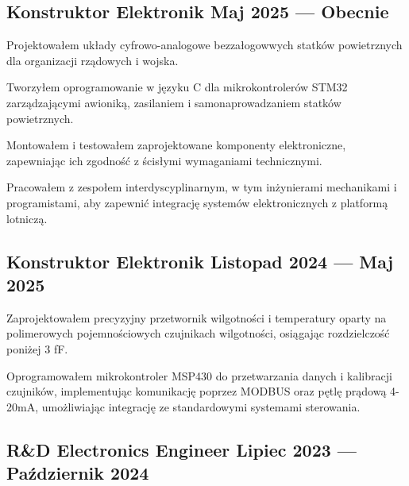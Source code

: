 
\subsection{{Konstruktor Elektronik \hfill Maj 2025 --- Obecnie}}

\begin{zitemize}
    \item Projektowałem układy cyfrowo-analogowe bezzałogowwych statków powietrznych dla organizacji rządowych i wojska.
    \item Tworzyłem oprogramowanie w języku C dla mikrokontrolerów STM32 zarządzającymi awioniką, zasilaniem i samonaprowadzaniem statków powietrznych.
    \item Montowałem i testowałem zaprojektowane komponenty elektroniczne, zapewniając ich zgodność z ścisłymi wymaganiami technicznymi.
    \item Pracowałem z zespołem interdyscyplinarnym, w tym inżynierami mechanikami i programistami, aby zapewnić integrację systemów elektronicznych z platformą lotniczą.
\end{zitemize}

\subsection{{Konstruktor Elektronik \hfill Listopad 2024 --- Maj 2025}}

\begin{zitemize}
    \item Zaprojektowałem precyzyjny przetwornik wilgotności i temperatury oparty na polimerowych pojemnościowych czujnikach wilgotności, osiągając rozdzielczość poniżej 3 fF.
    \item Oprogramowałem mikrokontroler MSP430 do przetwarzania danych i kalibracji czujników, implementując komunikację poprzez MODBUS oraz pętlę prądową 4-20mA, umożliwiając integrację ze standardowymi systemami sterowania.
\end{zitemize}

\subsection{{R\&D Electronics Engineer \hfill Lipiec 2023 --- Październik 2024}}


